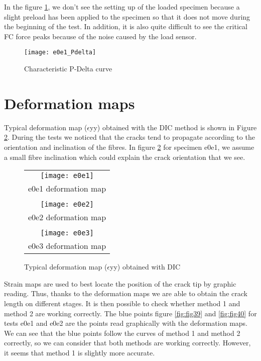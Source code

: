  In the figure \ref{fig:e0e1_Pdelta}, we don't see the setting up of the loaded specimen because a slight preload has been applied to the specimen so that it does not move during the beginning of the test. In addition, it is also quite difficult to see the critical FC force peaks because of the noise caused by the load sensor.

\begin{figure}[htp]
	\centering
	\texttt{[image: e0e1\_Pdelta]}
	\caption{Characteristic P-Delta curve}
	\label{fig:e0e1_Pdelta}
\end{figure}


\section{Deformation maps}

Typical deformation map ($\epsilon$yy) obtained with the DIC method is shown in Figure \ref{fig:Strain_def}.
During the tests we noticed that the cracks tend to propagate according to the orientation and inclination of the fibres.
In figure \ref{fig:Strain_def} for specimen e0e1, we assume a small fibre inclination which could explain the crack orientation that we see.

\begin{figure}[htp]
	\centering
	\begin{tabular}{c}
		\texttt{[image: e0e1]} \\
		e0e1 deformation map \\
		\\
		\texttt{[image: e0e2]} \\
		e0e2 deformation map \\
		\\
		\texttt{[image: e0e3]} \\
		e0e3 deformation map \\
	\end{tabular}
	\caption{Typical deformation map ($\epsilon$yy) obtained with DIC}
	\label{fig:Strain_def}
\end{figure}

Strain maps are used to best locate the position of the crack tip by graphic reading.
Thus, thanks to the deformation maps we are able to obtain the crack length on different stages. It is then possible to check whether method 1 and method 2 are working correctly.
The blue points figure \ref{fig:fig39} and \ref{fig:fig40} for tests e0e1 and e0e2 are the points read graphically with the deformation maps. We can see that the blue points follow the curves of method 1 and method 2 correctly, so we can consider that both methods are working correctly. However, it seems that method 1 is slightly more accurate.

